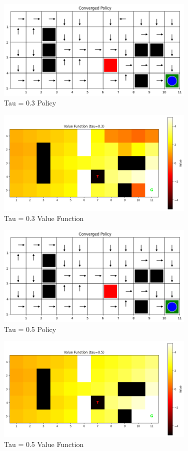 \documentclass[12pt]{article}
\begin{document}
\begin{figure}[H]
  \centering
  \includegraphics[width=0.85\textwidth]{images/part2_q3_tau_0.3_policy.png}
  \caption{Tau = 0.3 Policy}
\end{figure}
\begin{figure}[H]
  \centering
  \includegraphics[width=0.85\textwidth]{images/part2_q3_tau_0.3_value.png}
  \caption{Tau = 0.3 Value Function}
\end{figure}

\begin{figure}[H]
  \centering
  \includegraphics[width=0.85\textwidth]{images/part2_q3_tau_0.5_policy.png}
  \caption{Tau = 0.5 Policy}
\end{figure}
\begin{figure}[H]
  \centering
  \includegraphics[width=0.85\textwidth]{images/part2_q3_tau_0.5_value.png}
  \caption{Tau = 0.5 Value Function}
\end{figure}
\end{document}
